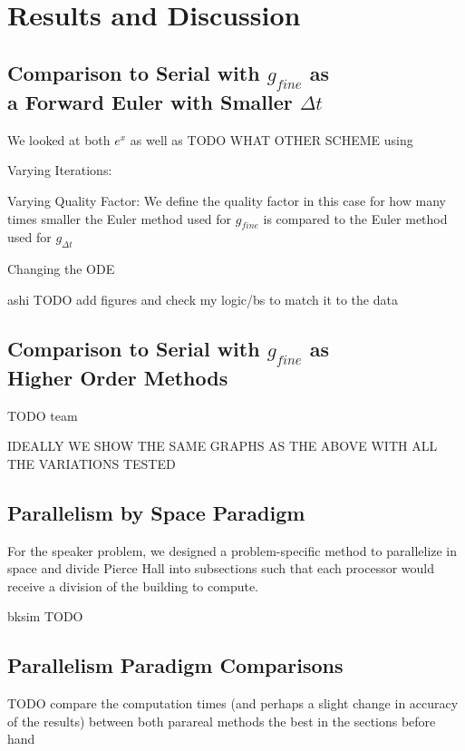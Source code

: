 \documentclass[letterpaper,twocolumn,11pt]{article}
\begin{document}
\section{Results and Discussion}

\subsection{Comparison to Serial with $g_{fine}$ as \\a Forward Euler with
Smaller $\Delta t$}

We looked at both $e^x$ as well as TODO WHAT OTHER SCHEME using

Varying Iterations:

Varying Quality Factor:
We define the quality factor in this case for how many times smaller the Euler method used for $g_{fine}$ is compared to the Euler method used for $g_{\Delta t}$

Changing the ODE

ashi TODO add figures and check my logic/bs to match it to the data

\subsection{Comparison to Serial with $g_{fine}$ as \\Higher Order Methods}

TODO team

IDEALLY WE SHOW THE SAME GRAPHS AS THE ABOVE WITH ALL THE VARIATIONS TESTED

\subsection{Parallelism by Space Paradigm}

For the speaker problem, we designed a problem-specific method to parallelize in space and divide Pierce Hall into subsections such that each processor would receive a division of the building to compute.

bksim TODO

\subsection{Parallelism Paradigm Comparisons}

TODO compare the computation times (and perhaps a slight change in accuracy of the results) between both parareal methods the best in the sections before hand
\end{document}
